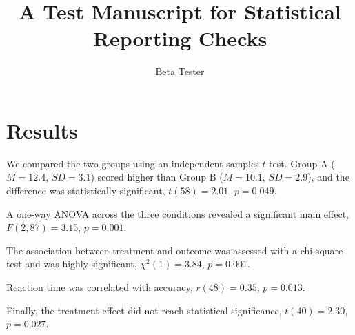 \documentclass{article}
\title{A Test Manuscript for Statistical Reporting Checks}
\author{Beta Tester}
\begin{document}
\maketitle

\section{Results}

We compared the two groups using an independent-samples $t$-test. Group A
($M = 12.4$, $SD = 3.1$) scored higher than Group B ($M = 10.1$, $SD = 2.9$),
and the difference was statistically significant, $t(58) = 2.01$, $p = 0.049$.

A one-way ANOVA across the three conditions revealed a significant main effect,
$F(2, 87) = 3.15$, $p = 0.001$.

The association between treatment and outcome was assessed with a chi-square test
and was highly significant, $\chi^2(1) = 3.84$, $p = 0.001$.

Reaction time was correlated with accuracy, $r(48) = 0.35$, $p = 0.013$.

Finally, the treatment effect did not reach statistical significance,
$t(40) = 2.30$, $p = 0.027$.
\end{document}
